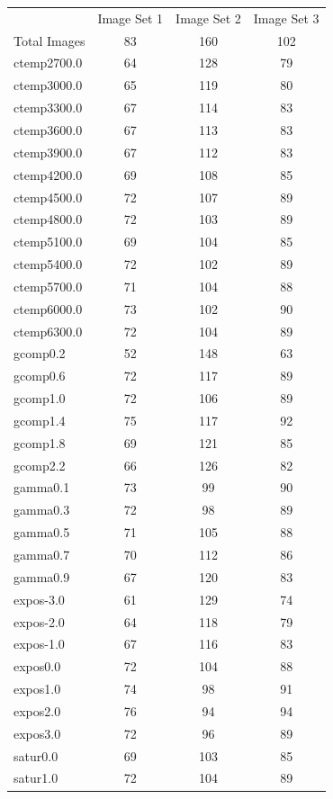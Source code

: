 \documentclass{report}
\begin{document}
\begin{center}
	\begin{tabular}{lccc}
		& Image Set 1 & Image Set 2 & Image Set 3 \\
		Total Images & 83 & 160 & 102 \\
		\hline
		ctemp2700.0 & 64 & 128 & 79\\
		ctemp3000.0 & 65 & 119 & 80\\
		ctemp3300.0 & 67 & 114 & 83\\
		ctemp3600.0 & 67 & 113 & 83\\
		ctemp3900.0 & 67 & 112 & 83\\
		ctemp4200.0 & 69 & 108 & 85\\
		ctemp4500.0 & 72 & 107 & 89\\
		ctemp4800.0 & 72 & 103 & 89\\
		ctemp5100.0 & 69 & 104 & 85\\
		ctemp5400.0 & 72 & 102 & 89\\
		ctemp5700.0 & 71 & 104 & 88\\
		ctemp6000.0 & 73 & 102 & 90\\
		ctemp6300.0 & 72 & 104 & 89\\
		gcomp0.2 & 52 & 148 & 63\\
		gcomp0.6 & 72 & 117 & 89\\
		gcomp1.0 & 72 & 106 & 89\\
		gcomp1.4 & 75 & 117 & 92\\
		gcomp1.8 & 69 & 121 & 85\\
		gcomp2.2 & 66 & 126 & 82\\
		gamma0.1 & 73 & 99 & 90\\
		gamma0.3 & 72 & 98 & 89\\
		gamma0.5 & 71 & 105 &88 \\
		gamma0.7 & 70 & 112 &86 \\
		gamma0.9 & 67 & 120 & 83\\
		expos-3.0 & 61 & 129 & 74\\
		expos-2.0 & 64 & 118 & 79\\
		expos-1.0 & 67 & 116 & 83\\
		expos0.0 & 72 & 104 & 88\\
		expos1.0 & 74 & 98 & 91\\
		expos2.0 & 76 & 94 & 94\\
		expos3.0 & 72 & 96 & 89\\
		satur0.0 & 69 & 103 & 85\\
		satur1.0 & 72 & 104 & 89\\

\end{tabular}
\end{center}
\end{document}
